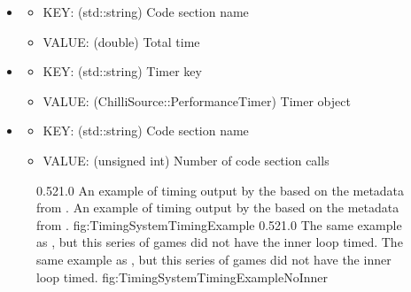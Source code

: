 
\begin{singlespace}

	\begin{itemize}[nolistsep,topsep=0pt]
	\itemsep1.0em

		\item {}
			\begin{itemize}[nolistsep,topsep=0pt]
				\item KEY:  (std::string) Code section name
				\item VALUE: (double) Total time
			\end{itemize}

		\item {}
			\begin{itemize}[nolistsep,topsep=0pt]
				\item KEY:  (std::string) Timer key
				\item VALUE: (ChilliSource::PerformanceTimer) Timer object
			\end{itemize}

		\item {}
			\begin{itemize}[nolistsep,topsep=0pt]
				\item KEY:  (std::string) Code section name
				\item VALUE: (unsigned int) Number of code section calls
			\end{itemize}

	\end{itemize}

\end{singlespace}

\begin{figure}[t]
\addtocounter{figure}{-1}
	{0.52}{1.0}
	{An example of timing output by the  based on the metadata from .}
	{An example of timing output by the  based on the metadata from .}
	{fig:TimingSystemTimingExample}
	{0.52}{1.0}
	{The same example as , but this series of games did not have the inner loop timed.}
	{The same example as , but this series of games did not have the inner loop timed.}
	{fig:TimingSystemTimingExampleNoInner}
\end{figure}

